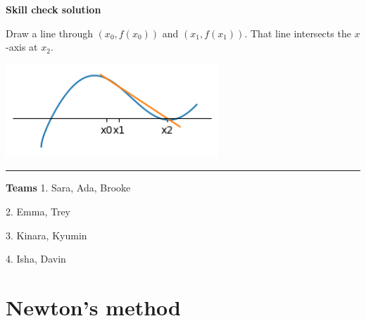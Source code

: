 \documentclass[12pt,letterpaper,noanswers]{exam}
\begin{document}
\noindent \textbf{Skill check solution}
\begin{questions}
\item Draw a line through $(x_0,f(x_0))$ and $(x_1, f(x_1))$.  That line intersects the $x$-axis at $x_2$.

\includegraphics[width=0.6\textwidth]{img/Quiz01secant-soln.png}

\end{questions}
\vspace{0.2cm}
\hrule
\vspace{0.2cm}

\noindent\textbf{Teams}
1. Sara, Ada, Brooke

2. Emma, Trey

3. Kinara, Kyumin

4. Isha, Davin

\section*{Newton's method}
\end{document}
